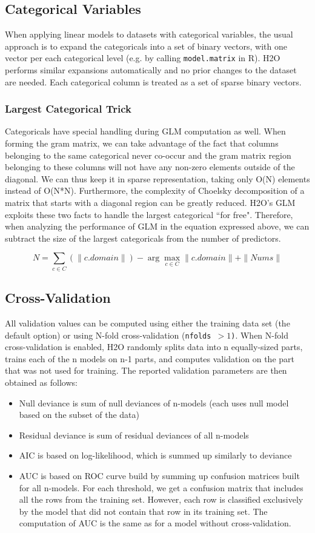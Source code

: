 \documentclass[11pt]{article}
\begin{document}
\subsection{Categorical Variables}
When applying linear models to datasets with categorical variables, the usual approach is to expand the categoricals into a set of binary vectors, with one vector per each categorical level (e.g. by calling {\texttt{model.matrix}} in R). H2O performs similar expansions automatically and no prior changes to the dataset are needed. Each categorical column is treated as a set of sparse binary vectors.

\subsubsection{Largest Categorical Trick}
Categoricals have special handling during GLM computation as well. When forming the gram matrix, we can take advantage of  the fact that columns belonging to the same categorical never co-occur and the gram matrix region belonging to these columns will not have any non-zero elements outside of the diagonal. We can thus keep it in sparse representation, taking only O(N) elements instead of O(N*N). Furthermore, the complexity of Choelsky decomposition of a matrix that starts with a diagonal region can be greatly reduced. H2O's GLM exploits these two facts to handle the largest categorical ``for free". Therefore, when analyzing the performance of GLM in the equation expressed above, we can subtract the size of the largest categoricals from the number of predictors.

$$N = \sum_{c \in C} (\|c.domain\|) - \arg\max_{c \in C} \|c.domain\| + \|Nums\| $$

\subsection{Cross-Validation}
All validation values can be computed using either the training data set (the default option) or using N-fold cross-validation (\texttt{nfolds $> 1$)}. When N-fold cross-validation is enabled, H2O randomly splits data into n equally-sized parts, trains each of the n models on n-1 parts, and computes validation on the part that was not used for training. The reported validation parameters are then obtained as follows:
\begin{itemize} 
\item Null deviance is sum of null deviances of n-models (each uses null model based on the subset of the data)
\item Residual deviance is sum of residual deviances of all n-models
\item AIC is based on log-likelihood, which is summed up similarly to deviance
\item AUC is based on ROC curve build  by summing up confusion matrices built for all n-models.
For each threshold, we get a confusion matrix that includes all the rows from
the training set. However, each row is classified exclusively by the model
that did not contain that row in its training set. The computation of AUC is the same as for a model without cross-validation. 
\end{itemize}
\end{document}
